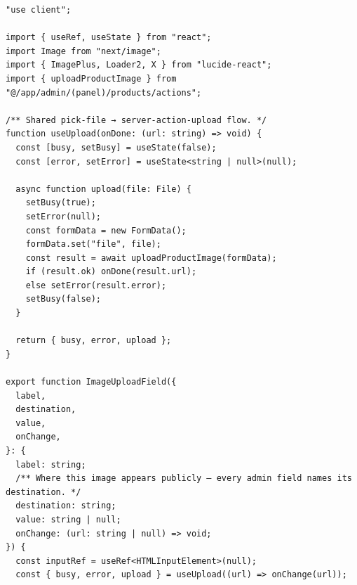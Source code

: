 \documentclass[11pt,a4paper]{article}
\begin{document}
\begin{lstlisting}
"use client";

import { useRef, useState } from "react";
import Image from "next/image";
import { ImagePlus, Loader2, X } from "lucide-react";
import { uploadProductImage } from "@/app/admin/(panel)/products/actions";

/** Shared pick-file → server-action-upload flow. */
function useUpload(onDone: (url: string) => void) {
  const [busy, setBusy] = useState(false);
  const [error, setError] = useState<string | null>(null);

  async function upload(file: File) {
    setBusy(true);
    setError(null);
    const formData = new FormData();
    formData.set("file", file);
    const result = await uploadProductImage(formData);
    if (result.ok) onDone(result.url);
    else setError(result.error);
    setBusy(false);
  }

  return { busy, error, upload };
}

export function ImageUploadField({
  label,
  destination,
  value,
  onChange,
}: {
  label: string;
  /** Where this image appears publicly — every admin field names its destination. */
  destination: string;
  value: string | null;
  onChange: (url: string | null) => void;
}) {
  const inputRef = useRef<HTMLInputElement>(null);
  const { busy, error, upload } = useUpload((url) => onChange(url));


\end{lstlisting}
\end{document}
